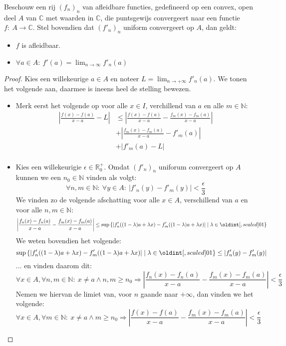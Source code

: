 \documentclass[main.tex]{subfiles}
\begin{document}
\begin{st}
  Beschouw een rij $(f_{n})_{n}$ van afleidbare functies, gedefineerd op een convex, open deel $A$ van $\mathbb{C}$ met waarden in $\mathbb{C}$, die puntsgewijs convergeert naar een functie $f:\ A \rightarrow \mathbb{C}$.
  Stel bovendien dat $(f'_{n})_{n}$ uniform convergeert op $A$, dan geldt:
  \begin{itemize}
  \item $f$ is afleidbaar.
  \item $\forall a\in A:\ f'(a) = \lim_{n \rightarrow \infty}f'_{n}(a)$
  \end{itemize}

  \begin{proof}
    Kies een willekeurige $a \in A$ en noteer $L= \lim_{n\rightarrow +\infty}f'_{n}(a)$.
    We tonen het volgende aan, daarmee is ineens heel de stelling bewezen.
    \begin{itemize}
    \item Merk eerst het volgende op voor alle $x\in I$, verchillend van $a$ en alle $m\in \mathbb{N}$:
      \[
      \begin{array}{rl}
        \left|\frac{f(x)-f(a)}{x-a}-L\right|
        &\le \left| \frac{f(x)-f(a)}{x-a} - \frac{f_{m}(x)-f_{m}(a)}{x-a} \right|\\
        & +  \left| \frac{f_{m}(x)-f_{m}(a)}{x-a} -f'_{m}(a) \right|\\
        & +  \left| f'_{m}(a)-L \right|\\
      \end{array}
      \]
    \item Kies een willekeurigie $\epsilon \in \mathbb{R}_{0}^{+}$.
      Omdat $(f'_{n})_{n}$ uniforum convergeert op $A$ kunnen we een $n_{0}\in \mathbb{N}$ vinden als volgt:
      \[ \forall n,m\in \mathbb{N}:\ \forall y\in A:\ \left| f'_{n}(y)-f'_{m}(y) \right| < \frac{\epsilon}{3} \]
      We vinden zo de volgende afschatting voor alle $x\in A$, verschillend van $a$ en voor alle $n,m\in \mathbb{N}$:
      \[ \left|\frac{f_{n}(x)-f_{n}(a)}{x-a} - \frac{f_{m}(x)-f_{m}(a)}{x-a}\right|
      \le \sup\left\{ \left|f_{n}'((1-\lambda)a+\lambda x) - f_{m}'((1-\lambda)a+\lambda x)\right| \mid \lambda \in \interval{0}{1} \right\}\]
      We weten bovendien het volgende:
      \[ \sup\left\{ \left|f_{n}'((1-\lambda)a+\lambda x) - f_{m}'((1-\lambda)a+\lambda x)\right| \mid \lambda \in \interval{0}{1} \right\} \le \left| f'_{n}(y)-f'_{m}(y) \right| \]
      ... en vinden daarom dit:
      \[ \forall x\in A, \forall n,m \in \mathbb{N}:\ x \neq a \wedge n,m\ge n_{0} \Rightarrow \left|\frac{f_{n}(x)-f_{n}(a)}{x-a} - \frac{f_{m}(x)-f_{m}(a)}{x-a}\right| < \frac{\epsilon}{3} \]
      Nemen we hiervan de limiet van, voor $n$ gaande naar $+\infty$, dan vinden we het volgende:
      \waarom
      \[ \forall x\in A, \forall m \in \mathbb{N}:\ x \neq a \wedge m\ge n_{0} \Rightarrow \left|\frac{f(x)-f(a)}{x-a} - \frac{f_{m}(x)-f_{m}(a)}{x-a}\right| < \frac{\epsilon}{3} \]
      

\end{itemize}
\end{proof}
\end{st}
\end{document}
